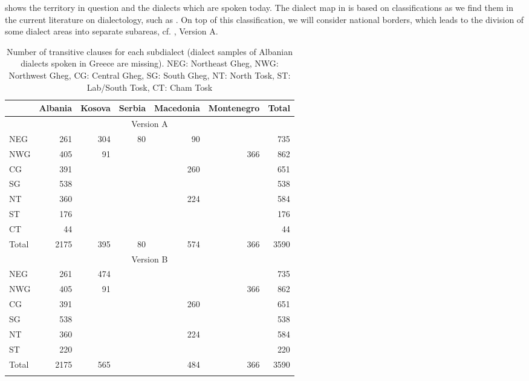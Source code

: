 \documentclass[output=paper]{langsci/langscibook}
\begin{document}
 shows the territory in question and the  dialects which are spoken today. The dialect map in  is based on classifications as we find them in the current literature on  dialectology, such as \citet{Gjinari2000}. On top of this classification, we will consider national borders, which leads to the division of some dialect areas into separate subareas, cf. , Version A.


\begin{table}
\caption{Number of transitive clauses for each subdialect (dialect samples of Albanian dialects spoken in Greece are missing). NEG: Northeast Gheg, NWG: Northwest Gheg, CG: Central Gheg, SG: South Gheg, NT: North Tosk, ST: Lab/South Tosk, CT: Cham Tosk\label{tab:matoshi:6}}
\begin{tabular}{lrrrrrr}
\lsptoprule
  & Albania  & Kosova & Serbia & Macedonia & Montenegro & Total \\
\midrule
\multicolumn{7}{c}{Version A} \\
\midrule
NEG  &  261  & 304 & 80 &  90 &     & 735 \\
NWG  &  405  &  91 &    &     & 366 & 862 \\
CG  &   391  &     &    & 260 &     & 651 \\
SG  &   538  &     &    &     &     & 538 \\
NT  &   360  &     &    & 224 &     & 584 \\
ST  &   176  &     &    &     &     & 176 \\
CT  &   44   &     &    &     &     &  44 \\
Total & 2175 & 395 & 80 & 574 & 366 & 3590 \\\midrule
\multicolumn{7}{c}{Version B} \\
\midrule
NEG   & 261  & 474 & &     &     & 735 \\
NWG   & 405  &  91 & &     & 366 & 862 \\
CG    & 391  &     & & 260 &     & 651 \\
SG    & 538  &     & &     &     & 538 \\
NT    & 360  &     & & 224 &     & 584 \\
ST    & 220  &     & &     &     & 220 \\
Total & 2175 & 565 & & 484 & 366 & 3590 \\
\lspbottomrule
\end{tabular}
\end{table}
\end{document}
